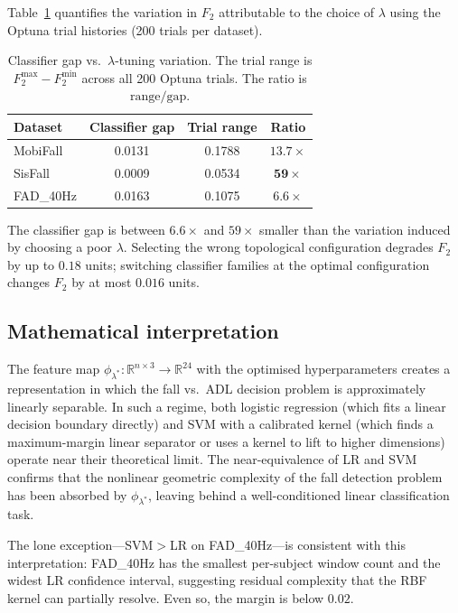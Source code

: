 \documentclass[onluarkali,ingilizce,yukseklisans,karton,LisansustuEgitim]{itutez}
\providecommand{\R}{\mathbb{R}}
\providecommand{\1}{\mathbf{1}}
\begin{document}
Table~\ref{tab:H3-comparison} quantifies the variation in $F_2$ attributable to the
choice of $\lambda$ using the Optuna trial histories (200 trials per dataset).

\begin{table}[h!]
\centering
\caption{Classifier gap vs.\ $\lambda$-tuning variation.  The trial range is
  $F_2^{\max} - F_2^{\min}$ across all 200 Optuna trials.  The ratio is
  $\text{range}/\text{gap}$.}
\label{tab:H3-comparison}
\small
\begin{tabular}{lccc}
\toprule
\textbf{Dataset} & \textbf{Classifier gap} & \textbf{Trial range} & \textbf{Ratio} \\
\midrule
MobiFall  & 0.0131 & 0.1788 & $\mathbf{13.7\times}$ \\
SisFall   & 0.0009 & 0.0534 & $\mathbf{59\times}$   \\
FAD\_40Hz & 0.0163 & 0.1075 & $\mathbf{6.6\times}$  \\
\bottomrule
\end{tabular}
\end{table}

The classifier gap is between $6.6\times$ and $59\times$ smaller than the variation
induced by choosing a poor $\lambda$.  Selecting the wrong topological configuration
degrades $F_2$ by up to $0.18$ units; switching classifier families at the optimal
configuration changes $F_2$ by at most $0.016$ units.

\subsection{Mathematical interpretation}

The feature map $\phi_{\lambda^*}\colon\R^{n\times 3}\to\R^{24}$ with the optimised
hyperparameters creates a representation in which the fall vs.\ ADL decision problem
is approximately linearly separable.  In such a regime, both logistic regression (which
fits a linear decision boundary directly) and SVM with a calibrated kernel (which finds
a maximum-margin linear separator or uses a kernel to lift to higher dimensions) operate
near their theoretical limit.  The near-equivalence of LR and SVM confirms that the
nonlinear geometric complexity of the fall detection problem has been absorbed by
$\phi_{\lambda^*}$, leaving behind a well-conditioned linear classification task.

The lone exception---SVM$>$LR on FAD\_40Hz---is consistent with this interpretation:
FAD\_40Hz has the smallest per-subject window count and the widest LR confidence
interval, suggesting residual complexity that the RBF kernel can partially resolve.
Even so, the margin is below $0.02$.
\end{document}
